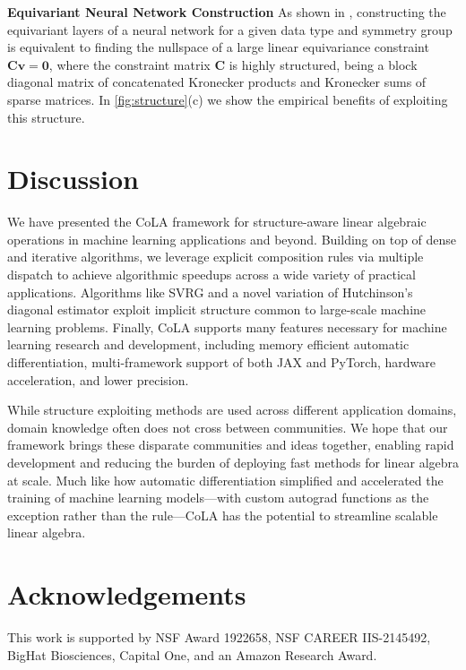 \documentclass{article}
\newcommand{\mbf}[1]{{\boldsymbol{\mathbf{#1}}}}
\renewcommand{\bm}{\mbf}
\begin{document}
\textbf{Equivariant Neural Network Construction} \quad
As shown in \citep{finzi2021practical}, constructing the equivariant layers of a neural network for a given data type and symmetry group is equivalent to finding the nullspace of a large linear equivariance constraint $\bm{C} \bm{v}=\bm{0}$, where the constraint matrix $\bm{C}$ is highly structured, being a block diagonal matrix of concatenated Kronecker products and Kronecker sums of sparse matrices. In \autoref{fig:structure}(c) we show the empirical benefits of exploiting this structure.

\section{Discussion}
We have presented the CoLA framework for structure-aware linear algebraic operations in machine learning applications and beyond. Building on top of dense and iterative
algorithms, we leverage explicit composition rules via multiple dispatch to achieve algorithmic speedups
across a wide variety of practical applications.
Algorithms like SVRG and a novel variation of Hutchinson's diagonal estimator exploit implicit structure common to large-scale machine learning problems.
Finally, CoLA supports many features necessary for machine learning research and development, including memory efficient automatic differentiation, multi-framework support of both JAX and PyTorch, hardware acceleration, and lower precision.

While structure exploiting methods are used across different application domains, domain knowledge often does not cross between communities.
We hope that our framework brings these disparate communities and ideas together, enabling rapid development and reducing the
burden of deploying fast methods for linear algebra at scale.
Much like how automatic differentiation simplified and accelerated the training of machine learning models---with custom autograd functions as the exception rather than the rule---CoLA has the potential to streamline scalable linear algebra.

\section*{Acknowledgements}
This work is supported by
NSF Award 1922658,
NSF CAREER IIS-2145492,
BigHat Biosciences,
Capital One,
and an Amazon Research Award.




\clearpage
\end{document}
